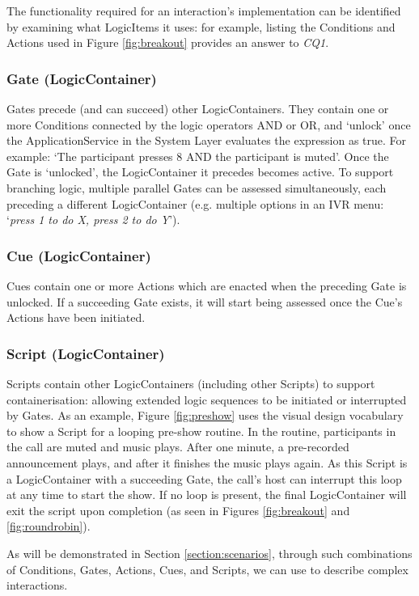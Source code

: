 The functionality required for an interaction's implementation can be identified by examining what LogicItems it uses: for example, listing the Conditions and Actions used in Figure \ref{fig:breakout} provides an answer to \textit{CQ1}.

\subsubsection{Gate (LogicContainer)}

Gates precede (and can succeed) other LogicContainers. They contain one or more Conditions connected by the logic operators AND or OR, and `unlock' once the ApplicationService in the System Layer evaluates the expression as true. For example: `The participant presses 8 AND the participant is muted'. Once the Gate is `unlocked', the LogicContainer it precedes becomes active. To support branching logic, multiple parallel Gates can be assessed simultaneously, each preceding a different LogicContainer (e.g. multiple options in an IVR menu: `\textit{press 1 to do X, press 2 to do Y}').  

\subsubsection{Cue (LogicContainer)}
Cues contain one or more Actions which are enacted when the preceding Gate is unlocked. If a succeeding Gate exists, it will start being assessed once the Cue's Actions have been initiated.

\subsubsection{Script (LogicContainer)}
Scripts contain other LogicContainers (including other Scripts) to support containerisation: allowing extended logic sequences to be initiated or interrupted by Gates. As an example, Figure \ref{fig:preshow} uses the visual design vocabulary to show a Script for a looping pre-show routine. In the routine, participants in the call are muted and music plays. After one minute, a pre-recorded announcement plays, and after it finishes the music plays again. As this Script is a LogicContainer with a succeeding Gate, the call's host can interrupt this loop at any time to start the show. If no loop is present, the final LogicContainer will exit the script upon completion (as seen in Figures \ref{fig:breakout} and \ref{fig:roundrobin}).

As will be demonstrated in Section \ref{section:scenarios}, through such combinations of Conditions, Gates, Actions, Cues, and Scripts, we can use \ONT{} to describe complex interactions.


